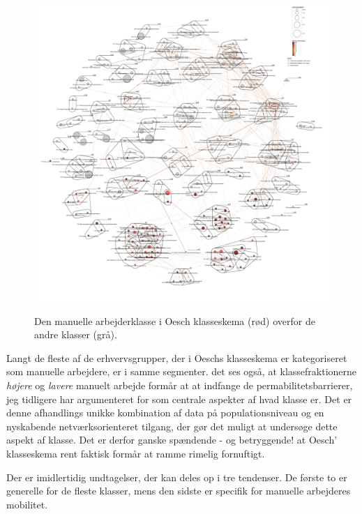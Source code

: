 %
   \begin{figure}[H]
   \begin{centering}
    \caption[Netværkskort: Manuel arbejderklasse - andre klasse]{Den manuelle arbejderklasse i Oesch klasseskema (rød) overfor de andre klasser (grå).}
    \includegraphics[width=\textwidth]{fig/netvaerkskort/kort_fokus_manuel_nonmanuel_roedgraa.pdf}
    \label{fig delanalyse3 klasse manuelt ikkemanuel}
   \end{centering}
   \end{figure}   
%


Langt de fleste af de erhvervsgrupper, der i Oeschs klasseskema er kategoriseret som manuelle arbejdere, er i samme segmenter. det ses også, at klassefraktionerne \emph{højere} og \emph{lavere} manuelt arbejde formår at at indfange de permabilitetsbarrierer, jeg tidligere har argumenteret for som centrale aspekter af hvad klasse er. Det er denne afhandlings unikke kombination af data på populationsniveau og en nyskabende netværksorienteret tilgang, der gør det muligt at undersøge dette aspekt af klasse. Det er derfor ganske spændende - og betryggende! at Oesch' klasseskema rent faktisk formår at ramme rimelig fornuftigt.

Der er imidlertidig undtagelser, der kan deles op i tre tendenser. De første to er generelle for de fleste klasser, mens den sidste er specifik for manuelle arbejderes mobilitet.

